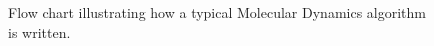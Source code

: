 \begin{figure}[h]
\label{fig:flow_simple_md}
\centering
\caption{Flow chart illustrating how a typical Molecular Dynamics algorithm is written. }
\end{figure}
